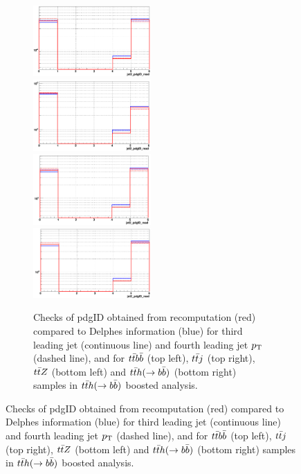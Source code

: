 \documentclass{cernrep}
\begin{document}
\begin{figure}[!htb]
\begin{figure}[!htb]\centering
\includegraphics[width=0.495\textwidth]{Fig/check_TRF/tth_boosted/jet34pdgID_ttbb_redModule_blueDELPHES.png}
\includegraphics[width=0.495\textwidth]{Fig/check_TRF/tth_boosted/jet34pdgID_ttj_redModule_blueDELPHES.png}
\includegraphics[width=0.495\textwidth]{Fig/check_TRF/tth_boosted/jet34pdgID_ttz_redModule_blueDELPHES.png}
\includegraphics[width=0.495\textwidth]{Fig/check_TRF/tth_boosted/jet34pdgID_tth_redModule_blueDELPHES.png}
\caption{Checks of pdgID obtained from recomputation (red) compared to Delphes information (blue) for third leading jet (continuous line) and fourth leading jet $p\sb{\scriptstyle\mathrm{T}}$ (dashed line), and for $t\bar{t}b\bar{b}$ (top left), $t\bar{t}j$ (top right), $t\bar{t}Z$ (bottom left) and $t\bar{t}h(\rightarrow b\bar{b})$ (bottom right) samples in $t\bar{t}h(\rightarrow b\bar{b})$ boosted analysis.}
\label{fig:tthboosted_TRFchecks2}
\end{figure}


\end{figure}
\end{document}

